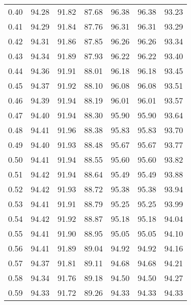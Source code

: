 \begin{tabular}{|c|c|c|c|c|c|c|}
      0.40 &     94.28 &     91.82 &      87.68 &   96.38 &      96.38 &         93.23 \\
      0.41 &     94.29 &     91.84 &      87.76 &   96.31 &      96.31 &         93.29 \\
      0.42 &     94.31 &     91.86 &      87.85 &   96.26 &      96.26 &         93.34 \\
      0.43 &     94.34 &     91.89 &      87.93 &   96.22 &      96.22 &         93.40 \\
      0.44 &     94.36 &     91.91 &      88.01 &   96.18 &      96.18 &         93.45 \\
      0.45 &     94.37 &     91.92 &      88.10 &   96.08 &      96.08 &         93.51 \\
      0.46 &     94.39 &     91.94 &      88.19 &   96.01 &      96.01 &         93.57 \\
      0.47 &     94.40 &     91.94 &      88.30 &   95.90 &      95.90 &         93.64 \\
      0.48 &     94.41 &     91.96 &      88.38 &   95.83 &      95.83 &         93.70 \\
      0.49 &     94.40 &     91.93 &      88.48 &   95.67 &      95.67 &         93.77 \\
      0.50 &     94.41 &     91.94 &      88.55 &   95.60 &      95.60 &         93.82 \\
      0.51 &     94.42 &     91.94 &      88.64 &   95.49 &      95.49 &         93.88 \\
      0.52 &     94.42 &     91.93 &      88.72 &   95.38 &      95.38 &         93.94 \\
      0.53 &     94.41 &     91.91 &      88.79 &   95.25 &      95.25 &         93.99 \\
      0.54 &     94.42 &     91.92 &      88.87 &   95.18 &      95.18 &         94.04 \\
      0.55 &     94.41 &     91.90 &      88.95 &   95.05 &      95.05 &         94.10 \\
      0.56 &     94.41 &     91.89 &      89.04 &   94.92 &      94.92 &         94.16 \\
      0.57 &     94.37 &     91.81 &      89.11 &   94.68 &      94.68 &         94.21 \\
      0.58 &     94.34 &     91.76 &      89.18 &   94.50 &      94.50 &         94.27 \\
      0.59 &     94.33 &     91.72 &      89.26 &   94.33 &      94.33 &         94.33 \\

\end{tabular}
